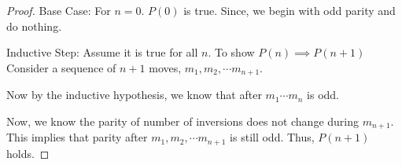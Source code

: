 \documentclass[titlepage,12pt]{book}
\begin{document}
\begin{solution}
{\begin{proof}
            Base Case: For $n=0$. $P(0)$ is true. Since, we begin with odd parity and do nothing.

            Inductive Step: Assume it is true for all $n$. To show $P(n) \implies P(n + 1)$
            Consider a sequence of $n + 1$ moves, $m_{1}, m_{2}, \cdots m_{n + 1}$.

            Now by the inductive hypothesis, we know that
            after $m_{1} \cdots m_{n}$ is odd.

            Now, we know the parity of number of inversions does not change during
            $m_{n + 1}$. This implies that parity after $m_{1}, m_{2}, \cdots m_{n + 1}$
            is still odd. Thus, $P(n + 1)$ holds.
        \end{proof}

    }
\end{solution}
\end{document}
